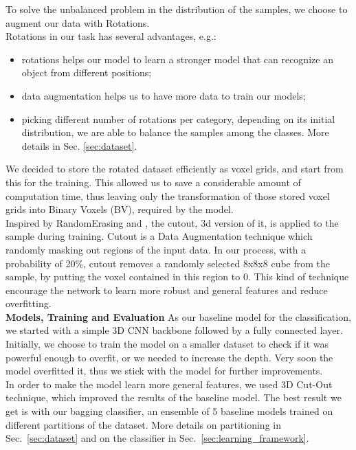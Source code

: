 To solve the unbalanced problem in the distribution of the samples, we choose to augment our data with Rotations. \\
Rotations in our task has several advantages, e.g.: 
\begin{itemize}
    \item rotations helps our model to learn a stronger model that can recognize an object from different positions;
    \item data augmentation helps us to have more data to train our models;
    \item picking different number of rotations per category, depending on its initial distribution, we are able to balance the samples among the classes. More details in Sec. \ref{sec:dataset}.
\end{itemize}



We decided to store the rotated dataset efficiently as voxel grids, and start from this for the training. This allowed us to save a considerable amount of computation time, thus leaving only the transformation of those stored voxel grids into Binary Voxels (BV), required by the model.\\

Inspired by RandomErasing \cite{zhong2017random} and \cite{devries2017improved} , the cutout, 3d version of it, is applied to the sample during training. Cutout is a Data Augmentation technique which randomly masking out regions of the input data.
In our process, with a probability of 20\%, cutout removes a randomly selected 8x8x8 cube from the sample, by putting the voxel contained in this region to 0. This kind of technique encourage the network to learn more robust and general features and reduce overfitting. 
\\

\textbf{Models, Training and Evaluation}
As our baseline model for the classification, we started with a simple 3D CNN backbone followed by a fully connected layer. 
Initially, we choose to train the model on a smaller dataset to check if it was powerful enough to overfit, or we needed to increase the depth. Very soon the model overfitted it, thus we stick with the model for further improvements.\\
In order to make the model learn more general features, we used 3D Cut-Out technique, which improved the results of the baseline model.
The best result we get is with our bagging classifier, an ensemble of 5 baseline models trained on different partitions of the dataset. More details on partitioning in Sec.~\ref{sec:dataset} and on the classifier in Sec.~\ref{sec:learning_framework}.\\

